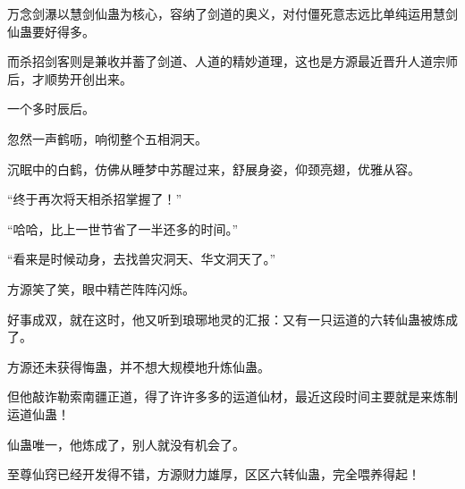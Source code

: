 \begin{this_body}
万念剑瀑以慧剑仙蛊为核心，容纳了剑道的奥义，对付僵死意志远比单纯运用慧剑仙蛊要好得多。

而杀招剑客则是兼收并蓄了剑道、人道的精妙道理，这也是方源最近晋升人道宗师后，才顺势开创出来。

一个多时辰后。

忽然一声鹤呖，响彻整个五相洞天。

沉眠中的白鹤，仿佛从睡梦中苏醒过来，舒展身姿，仰颈亮翅，优雅从容。

“终于再次将天相杀招掌握了！”

“哈哈，比上一世节省了一半还多的时间。”

“看来是时候动身，去找兽灾洞天、华文洞天了。”

方源笑了笑，眼中精芒阵阵闪烁。

好事成双，就在这时，他又听到琅琊地灵的汇报：又有一只运道的六转仙蛊被炼成了。

方源还未获得悔蛊，并不想大规模地升炼仙蛊。

但他敲诈勒索南疆正道，得了许许多多的运道仙材，最近这段时间主要就是来炼制运道仙蛊！

仙蛊唯一，他炼成了，别人就没有机会了。

至尊仙窍已经开发得不错，方源财力雄厚，区区六转仙蛊，完全喂养得起！

\end{this_body}

